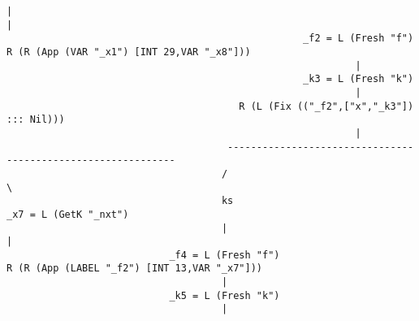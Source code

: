 \begin{landscape}
\begin{lstlisting}[basicstyle=\fontsize{6.5}{7.5}\selectfont\ttfamily]
                                                            |                                                                                   |                                
                                                   _f2 = L (Fresh "f")                                                      R (R (App (VAR "_x1") [INT 29,VAR "_x8"]))           
                                                            |                                                                                                                    
                                                   _k3 = L (Fresh "k")                                                                                                           
                                                            |                                                                                                                    
                                        R (L (Fix (("_f2",["x","_k3"]) ::: Nil)))                                                                                                
                                                            |                                                                                                                    
                                      -------------------------------------------------------------                                                                              
                                     /                                                             \                                                                             
                                     ks                                                  _x7 = L (GetK "_nxt")                                                                   
                                     |                                                             |                                                                             
                            _f4 = L (Fresh "f")                               R (R (App (LABEL "_f2") [INT 13,VAR "_x7"]))                                                       
                                     |                                                                                                                                           
                            _k5 = L (Fresh "k")                                                                                                                                  
                                     |                                                                                                                                           

\end{lstlisting}
\end{landscape}
